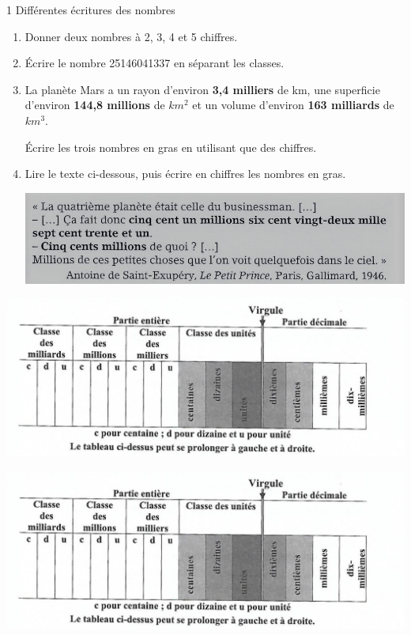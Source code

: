 \documentclass[12pt,a4paper]{article}
\begin{document}
\begin{myact}{1 Différentes écritures des nombres}
	
	\label{act:nbres}
	
	\begin{enumerate}
		\item Donner deux nombres à 2, 3, 4 et 5 chiffres.
		
		\item \'Ecrire  le nombre 25146041337 en séparant les classes.
		\item La planète Mars a un rayon d'environ \textbf{3,4 milliers} de km, une superficie d'environ \textbf{144,8 millions} de $km^2$ et un volume d'environ \textbf{163 milliards} de $km^3$.
		
		\'Ecrire les trois nombres en gras en utilisant que des chiffres.
		
		\item Lire le texte ci-dessous, puis écrire en chiffres les nombres en gras.
		
		\begin{center}
			\includegraphics[scale=1.1]{img/act1}
		\end{center}
	\end{enumerate}
\end{myact}


\begin{center}
	\includegraphics[scale=1]{img/tab}
\end{center}

\vspace*{0.25cm}
\begin{center}
	\includegraphics[scale=1]{img/tab}
\end{center}
\end{document}
